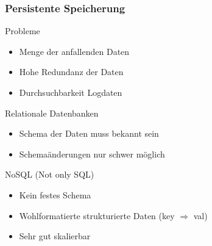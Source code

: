\begin{frame}
\frametitle{Persistente Speicherung}

\pause

\begin{alertblock}{Probleme}
    \begin{itemize}
        \item Menge der anfallenden Daten
        \item Hohe Redundanz der Daten
        \item Durchsuchbarkeit Logdaten
    \end{itemize}
\end{alertblock}

\pause

\begin{alertblock}{Relationale Datenbanken}
    \begin{itemize}
        \item Schema der Daten muss bekannt sein
        \item Schemaänderungen nur schwer möglich
    \end{itemize}
\end{alertblock}
\pause

\begin{exampleblock}{NoSQL (Not only SQL)}
    \begin{itemize}
        \item Kein festes Schema
        \item Wohlformatierte strukturierte Daten (key $\Rightarrow$ val)
        \item Sehr gut skalierbar
    \end{itemize}
\end{exampleblock}
\end{frame}

